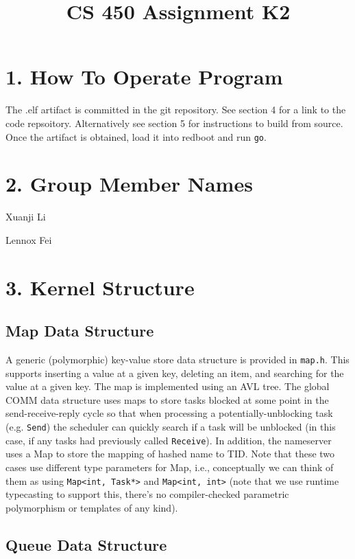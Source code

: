 \documentclass{article}
\title{CS 450 Assignment K2}
\date{}
\begin{document}
\maketitle


\section*{1. How To Operate Program}

The .elf artifact is committed in the git repository. See section 4 for a link to the code repsoitory. Alternatively see section 5 for instructions to build from source. Once the artifact is obtained, load it into redboot and run \texttt{go}.

\section*{2. Group Member Names}

Xuanji Li

Lennox Fei

\section*{3. Kernel Structure}

\subsection*{Map Data Structure}

A generic (polymorphic) key-value store data structure is provided in \texttt{map.h}. This supports inserting a value at a given key, deleting an item, and searching for the value at a given key. The map is implemented using an AVL tree. The global COMM data structure uses maps to store tasks blocked at some point in the send-receive-reply cycle so that when processing a potentially-unblocking task (e.g. \texttt{Send}) the scheduler can quickly search if a task will be unblocked (in this case, if any tasks had previously called \texttt{Receive}). In addition, the nameserver uses a Map to store the mapping of hashed name to TID. Note that these two cases use different type parameters for Map, i.e., conceptually we can think of them as using \texttt{Map<int, Task*>} and \texttt{Map<int, int>} (note that we use runtime typecasting to support this, there's no compiler-checked parametric polymorphism or templates of any kind).

\subsection*{Queue Data Structure}
\end{document}
